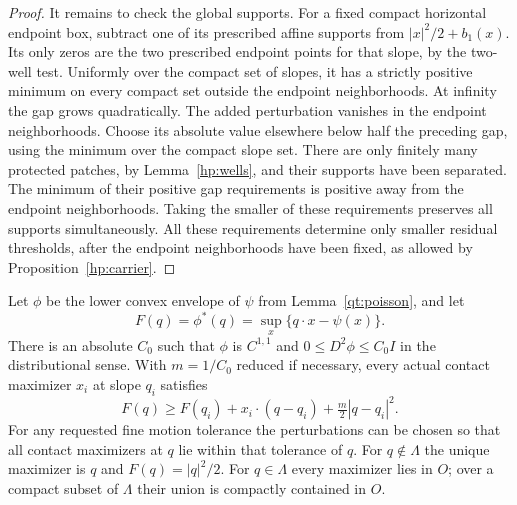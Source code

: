 \begin{proof}
It remains to check the global supports.  For a fixed compact horizontal
endpoint box, subtract one of its prescribed affine supports from
$|x|^2/2+b_1(x)$.  Its only zeros are the two prescribed endpoint points
for that slope, by the two-well test.  Uniformly over the compact set of
slopes, it has a strictly positive minimum on every compact set outside
the endpoint neighborhoods.  At infinity the gap grows quadratically.
The added perturbation vanishes in the endpoint neighborhoods.  Choose
its absolute value elsewhere below half the preceding gap, using the
minimum over the compact slope set.  There are only finitely many protected
patches, by Lemma~\ref{hp:wells}, and their supports have been separated.
The minimum of their positive gap requirements is positive away from
the endpoint neighborhoods.  Taking the smaller of these requirements preserves all supports
simultaneously.  All these requirements determine only smaller residual
thresholds, after the endpoint neighborhoods have been fixed, as allowed
by Proposition~\ref{hp:carrier}.
\end{proof}

\begin{lemma}\label{qt:contact}
Let $\phi$ be the lower convex envelope of $\psi$ from
Lemma~\ref{qt:poisson}, and let
\[
 F(q)=\phi^*(q)=\sup_x\{q\cdot x-\psi(x)\}.
\]
There is an absolute $C_0$ such that $\phi$ is $C^{1,1}$ and
$0\leq D^2\phi\leq C_0 I$ in the distributional sense.
With $m=1/C_0$ reduced if necessary, every actual contact maximizer
$x_i$ at slope $q_i$ satisfies
\begin{equation}\label{qt:dual-gap}
 F(q)\geq F(q_i)+x_i\cdot(q-q_i)+\tfrac m2|q-q_i|^2.
\end{equation}
For any requested fine motion tolerance the perturbations can be chosen
so that all contact maximizers at $q$ lie within that tolerance of $q$.
For $q\notin\Lambda$ the unique maximizer is $q$ and $F(q)=|q|^2/2$.
For $q\in\Lambda$ every maximizer lies in $O$; over a compact subset of
$\Lambda$ their union is compactly contained in $O$.
\end{lemma}

